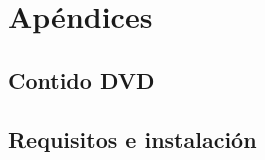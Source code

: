 \newpage
\chapter*{Apéndices}
\thispagestyle{empty}

\section{Contido DVD}

\section{Requisitos e instalación}

\newpage
\thispagestyle{empty}
